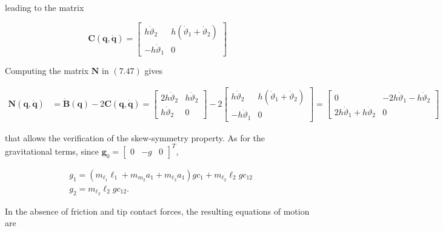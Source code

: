 \documentclass[10pt]{article}
\begin{document}
leading to the matrix

$$
\boldsymbol{C}(\boldsymbol{q}, \dot{\boldsymbol{q}})=\left[\begin{array}{cc}
h \dot{\vartheta}_{2} & h\left(\dot{\vartheta}_{1}+\dot{\vartheta}_{2}\right) \\
-h \dot{\vartheta}_{1} & 0
\end{array}\right]
$$

Computing the matrix $\boldsymbol{N}$ in $(7.47)$ gives

$$
\begin{aligned}
\boldsymbol{N}(\boldsymbol{q}, \dot{\boldsymbol{q}}) & =\dot{\boldsymbol{B}}(\boldsymbol{q})-2 \boldsymbol{C}(\boldsymbol{q}, \dot{\boldsymbol{q}}) =\left[\begin{array}{cc}
2 h \dot{\vartheta}_{2} & h \dot{\vartheta}_{2} \\
h \dot{\vartheta}_{2} & 0
\end{array}\right]-2\left[\begin{array}{cc}
h \dot{\vartheta}_{2} & h\left(\dot{\vartheta}_{1}+\dot{\vartheta}_{2}\right) \\
-h \dot{\vartheta}_{1} & 0
\end{array}\right]  =\left[\begin{array}{cc}
0 & -2 h \dot{\vartheta}_{1}-h \dot{\vartheta}_{2} \\
2 h \dot{\vartheta}_{1}+h \dot{\vartheta}_{2} & 0
\end{array}\right]
\end{aligned}
$$

that allows the verification of the skew-symmetry property. As for the gravitational terms, since $\boldsymbol{g}_{0}=\left[\begin{array}{lll}0 & -g & 0\end{array}\right]^{T}$, 

$$
\begin{aligned}
& g_{1}=\left(m_{\ell_{1}} \ell_{1}+m_{m_{2}} a_{1}+m_{\ell_{2}} a_{1}\right) g c_{1}+m_{\ell_{2}} \ell_{2} g c_{12} \\
& g_{2}=m_{\ell_{2}} \ell_{2} g c_{12} .
\end{aligned}
$$

In the absence of friction and tip contact forces, the resulting equations of motion are
\end{document}
